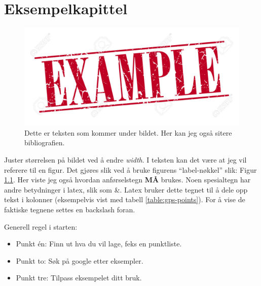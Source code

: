 \documentclass[a4paper]{report}
\begin{document}
    \listoftodos

    \chapter{Eksempelkapittel}
    
    \begin{figure}[h!]
        \centering
        \includegraphics[width=1\textwidth]{figures/eksempel.jpg}
        \caption{
            Dette er teksten som kommer under bildet. Her kan jeg også sitere bibliografien\cite{databladtemp}.
        } 
        \label{fig:eks-stempel}
    \end{figure}
    
    Juster størrelsen på bildet ved å endre \textit{width}.
    I teksten kan det være at jeg vil referere til en figur. Det gjøres slik ved å bruke figurens ``label-nøkkel'' slik: Figur \ref{fig:eks-stempel}. Her viste jeg også hvordan anførselstegn \textbf{MÅ} brukes. Noen spesialtegn har andre betydninger i latex, slik som \&. Latex bruker dette tegnet til å dele opp tekst i kolonner (eksempelvis vist med tabell \ref{table:gps-points}). For å vise de faktiske tegnene settes en backslash foran.
    
    Generell regel i starten:
    \begin{itemize}
        \item{Punkt én: Finn ut hva du vil lage, feks en punktliste.}
        \item{Punkt to: Søk på google etter eksempler.}
        \item{Punkt tre: Tilpass eksempelet ditt bruk.}
    \end{itemize}
    
    
    
    
    
    
    
    
    
    
    
\end{document}

